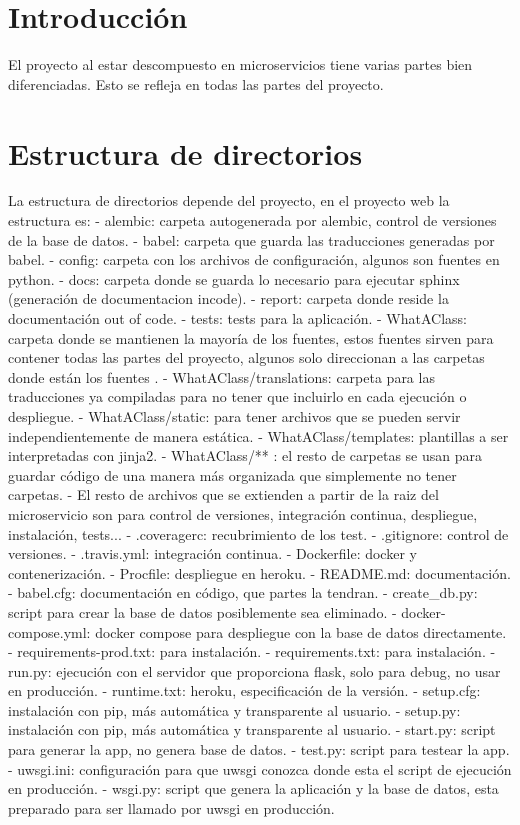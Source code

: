 
\section{Introducción}

El proyecto al estar descompuesto en microservicios tiene varias partes bien diferenciadas. Esto se refleja en todas las partes del proyecto. 

\section{Estructura de directorios}

La estructura de directorios depende del proyecto, en el proyecto web la estructura es:
 - alembic: carpeta autogenerada por alembic, control de versiones de la base de datos.
 - babel: carpeta que guarda las traducciones generadas por babel.
 - config: carpeta con los archivos de configuración, algunos son fuentes en python.
 - docs: carpeta donde se guarda lo necesario para ejecutar sphinx (generación de documentacion incode).
 - report: carpeta donde reside la documentación out of code.
 - tests: tests para la aplicación.
 - WhatAClass: carpeta donde se mantienen la mayoría de los fuentes, estos fuentes sirven para contener todas las partes del proyecto, algunos solo direccionan a las carpetas donde están los fuentes .
 - WhatAClass/translations: carpeta para las traducciones ya compiladas para no tener que incluirlo en cada ejecución o despliegue.
 - WhatAClass/static: para tener archivos que se pueden servir independientemente de manera estática.
 - WhatAClass/templates: plantillas a ser interpretadas con jinja2.
 - WhatAClass/** : el resto de carpetas se usan para guardar código de una manera más organizada que simplemente no tener carpetas.
 - El resto de archivos que se extienden a partir de la raiz del microservicio son para control de versiones, integración continua, despliegue, instalación, tests...
   - .coveragerc: recubrimiento de los test.
   - .gitignore: control de versiones.
   - .travis.yml: integración continua.
   - Dockerfile: docker y contenerización.
   - Procfile: despliegue en heroku.
   - README.md: documentación.
   - babel.cfg: documentación en código, que partes la tendran.
   - create_db.py: script para crear la base de datos posiblemente sea eliminado.
   - docker-compose.yml: docker compose para despliegue con la base de datos directamente.
   - requirements-prod.txt: para instalación.
   - requirements.txt: para instalación.
   - run.py: ejecución con el servidor que proporciona flask, solo para debug, no usar en producción.
   - runtime.txt: heroku, especificación de la versión.
   - setup.cfg: instalación con pip, más automática y transparente al usuario. 
   - setup.py: instalación con pip, más automática y transparente al usuario. 
   - start.py: script para generar la app, no genera base de datos.
   - test.py: script para testear la app. 
   - uwsgi.ini: configuración para que uwsgi conozca donde esta el script de ejecución en producción.
   - wsgi.py: script que genera la aplicación y la base de datos, esta preparado para ser llamado por uwsgi en producción.
 

